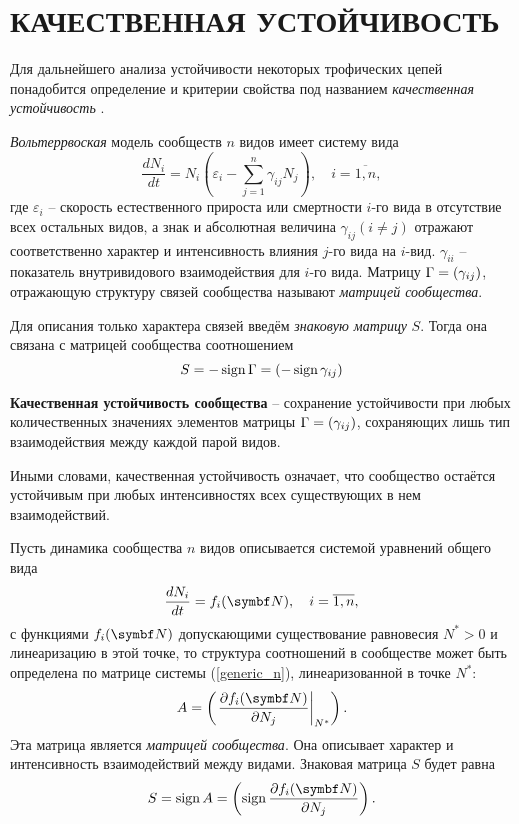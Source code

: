\section{КАЧЕСТВЕННАЯ УСТОЙЧИВОСТЬ}
    Для дальнейшего анализа устойчивости некоторых трофических цепей понадобится определение и критерии свойства под названием \textit{качественная устойчивость} \cite{svilog}.

    \textit{Вольтеррвоская} модель сообществ \(n\) видов имеет систему вида
    \begin{equation}
        \frac{d N_i}{d t} = N_i \left( \varepsilon_i - \sum_{j=1}^{n} \gamma_{ij} N_j \right), \quad i=\overline{1,n},
    \end{equation}
    где \(\varepsilon_i\) -- скорость естественного прироста или смертности \(i\)-го вида в отсутствие всех остальных видов, а знак и абсолютная величина \(\gamma_{ij} (i \neq j)\) отражают соответственно характер и интенсивность влияния \(j\)-го вида на \(i\)-вид. \(\gamma_{ii}\) -- показатель внутривидового взаимодействия для \(i\)-го вида. Матрицу \(\Gamma = \left(  \gamma_{ij}  \right) \), отражающую структуру связей сообщества называют \textit{матрицей сообщества}.

    Для описания только характера связей введём \textit{знаковую матрицу} \(S\). Тогда она связана с матрицей сообщества соотношением 
    \[
        S = -\operatorname{sign} \Gamma = \left(  - \operatorname{sign} \gamma_{ij}  \right)
    \]

    \begin{definition}
        \textbf{Качественная устойчивость сообщества} -- сохранение устойчивости при любых количественных значениях элементов матрицы \(\Gamma = \left(  \gamma_{ij}  \right)\), сохраняющих лишь тип взаимодействия между каждой парой видов.
    \end{definition}

    Иными словами, качественная устойчивость означает, что сообщество остаётся устойчивым при любых интенсивностях всех существующих в нем взаимодействий.

    Пусть динамика сообщества \(n\) видов описывается системой уравнений общего вида
    \begin{equation} \label{generic_n}
        \frac{d N_i}{d t} = f_i( \mb{N} ), \quad i = \overline{1,n},
    \end{equation}
    с функциями \(f_i ( \mb{N} )\) допускающими существование равновесия \(N^* > 0\) и линеаризацию в этой точке, то структура соотношений в сообществе может быть определена по матрице системы (\ref{generic_n}), линеаризованной в точке \(N^*\):
    \begin{equation}
        A = \pares{ \left. \frac{\D f_i ( \mb{N} )}{\D N_j} \right|_{N^*} }.
    \end{equation}
    Эта матрица является \textit{матрицей сообщества}. Она описывает характер и интенсивность взаимодействий между видами. Знаковая матрица \(S\) будет равна
    \begin{equation} \label{sign_partial}
        S = \sign A = \pares{ \sign \frac{\D f_i ( \mb{N} )}{\D N_j} }.
    \end{equation}

